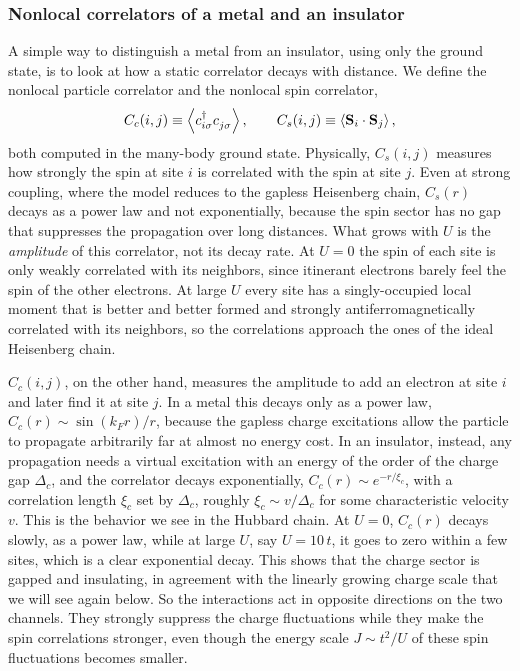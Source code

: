 \documentclass[lecture_notes.tex]{subfiles}
\begin{document}
\subsubsection{Nonlocal correlators of a metal and an insulator}
A simple way to distinguish a metal from an insulator, using only the ground state, is to look at
how a static correlator decays with distance. We define the nonlocal particle correlator and the
nonlocal spin correlator,
\begin{equation}
  C_c(i,j) \equiv \expval{\cre{i\sigma}\ann{j\sigma}}, \qquad
  C_s(i,j) \equiv \expval{\vb S_i \cdot \vb S_j},
  \label{eq:corrdefs}
\end{equation}
both computed in the many-body ground state. Physically, $C_s(i,j)$ measures how strongly the spin
at site $i$ is correlated with the spin at site $j$. Even at strong coupling, where the model
reduces to the gapless Heisenberg chain, $C_s(r)$ decays as a power law and not exponentially,
because the spin sector has no gap that suppresses the propagation over long distances. What grows
with $U$ is the \emph{amplitude} of this correlator, not its decay rate. At $U=0$ the spin of each
site is only weakly correlated with its neighbors, since itinerant electrons barely feel the spin
of the other electrons. At large $U$ every site has a singly-occupied local moment that is better
and better formed and strongly antiferromagnetically correlated with its neighbors, so the
correlations approach the ones of the ideal Heisenberg chain.

$C_c(i,j)$, on the other hand, measures the amplitude to add an electron at site $i$ and later find
it at site $j$. In a metal this decays only as a power law, $C_c(r)\sim \sin(k_F r)/r$, because the
gapless charge excitations allow the particle to propagate arbitrarily far at almost no energy
cost. In an insulator, instead, any propagation needs a virtual excitation with an energy of the order of
the charge gap $\Delta_c$, and the correlator decays exponentially, $C_c(r) \sim e^{-r/\xi_c}$, with a
correlation length $\xi_c$ set by $\Delta_c$, roughly $\xi_c \sim v/\Delta_c$ for some
characteristic velocity $v$. This is the behavior we see in the Hubbard chain. At $U=0$, $C_c(r)$
decays slowly, as a power law, while at large $U$, say $U=10\,t$, it goes to zero within a few
sites, which is a clear exponential decay. This shows that the charge sector is gapped and
insulating, in agreement with the linearly growing charge scale that we will see again below. So
the interactions act in opposite directions on the two channels. They strongly suppress the charge
fluctuations while they make the spin correlations stronger, even though the energy scale
$J\sim t^2/U$ of these spin fluctuations becomes smaller.
\end{document}
